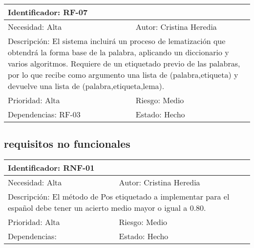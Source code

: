 \begin{table}[H]
\label{my-label}
\begin{tabular}{|l|l|l|l|l|l|l|}
\hline
\multicolumn{7}{|l|}{\textcolor{SchoolColor}{Identificador:} RF-07}                                 \\ \hline
\multicolumn{4}{|l|}{\textcolor{SchoolColor}{Necesidad:} Alta} & \multicolumn{3}{l|}{\textcolor{SchoolColor}{Autor:} Cristina Heredia}         \\ \hline
\multicolumn{7}{|L|}{\textcolor{SchoolColor}{Descripción:} El sistema incluirá un proceso de lematización que obtendrá la forma base de la palabra, aplicando un diccionario y varios algoritmos. 
Requiere de un etiquetado previo de las palabras, por lo que recibe como argumento una lista de (palabra,etiqueta) y devuelve una lista de (palabra,etiqueta,lema). }                                 \\ \hline
\multicolumn{4}{|l|}{\textcolor{SchoolColor}{Prioridad: }Alta} & \multicolumn{3}{l|}{\textcolor{SchoolColor}{Riesgo:} Medio}         \\ \hline
\multicolumn{5}{|l|}{\textcolor{SchoolColor}{Dependencias: }RF-03 }         & \multicolumn{2}{l|}{\textcolor{SchoolColor}{Estado:} Hecho} \\ \hline
\end{tabular}
\end{table}

\subsection*{requisitos no funcionales}
\begin{table}[H]
\label{my-label}
\begin{tabular}{|l|l|l|l|l|l|l|}
\hline
\multicolumn{7}{|l|}{\textcolor{SchoolColor}{Identificador:} RNF-01}                                 \\ \hline
\multicolumn{4}{|l|}{\textcolor{SchoolColor}{Necesidad:} Alta} & \multicolumn{3}{l|}{\textcolor{SchoolColor}{Autor:} Cristina Heredia}         \\ \hline
\multicolumn{7}{|L|}{\textcolor{SchoolColor}{Descripción:} El método de Pos etiquetado a implementar 
para el español debe tener un acierto medio mayor o igual a 0.80. }                                 \\ \hline
\multicolumn{4}{|l|}{\textcolor{SchoolColor}{Prioridad: }Alta} & \multicolumn{3}{l|}{\textcolor{SchoolColor}{Riesgo:} Medio}         \\ \hline
\multicolumn{5}{|l|}{\textcolor{SchoolColor}{Dependencias: } }         & \multicolumn{2}{l|}{\textcolor{SchoolColor}{Estado:} Hecho} \\ \hline
\end{tabular}
\end{table}

